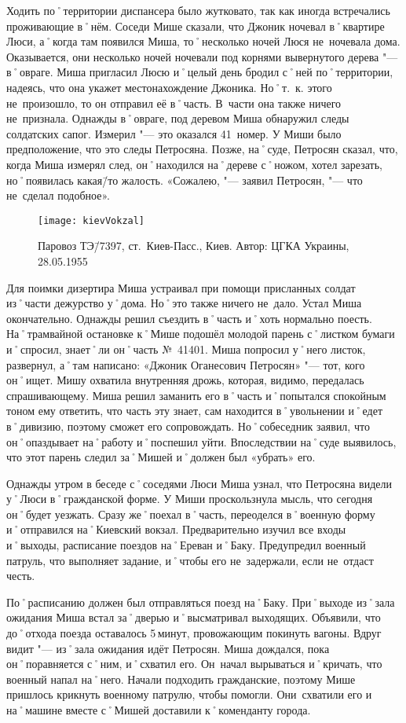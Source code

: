 Ходить по˚территории диспансера было жутковато, так как иногда встречались проживающие в˚нём. Соседи Мише сказали, что Джоник ночевал в˚квартире Люси, а˚когда там появился Миша, то˚несколько ночей Люся не~ночевала дома. Оказывается, они несколько ночей ночевали под корнями вывернутого дерева "--- в˚овраге. Миша пригласил Люсю и˚целый день бродил с˚ней по˚территории, надеясь, что она укажет местонахождение Джоника. Но˚т.~к. этого не~произошло, то он отправил её в˚часть. В~части она также ничего не~признала. Однажды в˚овраге, под деревом Миша обнаружил следы солдатских сапог. Измерил "--- это оказался 41~номер. У Миши  было предположение, что это следы Петросяна. Позже, на˚суде, Петросян сказал, что, когда Миша измерял след, он˚находился на˚дереве с˚ножом, хотел зарезать, но˚появилась какая\=/то жалость. «Сожалею, "--- заявил Петросян, "--- что не~сделал подобное».  

\begin{wrapfigure}{O}{.4\textwidth}
\centering
\texttt{[image: kievVokzal]}
\caption{Паровоз ТЭ\=/7397, ст.~Киев-Пасс., Киев. Автор: ЦГКА Украины, 28.05.1955}
\label{fig:kievVokzal}
\end{wrapfigure}

Для поимки дизертира Миша устраивал при помощи присланных солдат из˚части дежурство у˚дома. Но˚это также ничего не~дало. Устал Миша окончательно. Однажды решил съездить в˚часть и˚хоть нормально поесть. На˚трамвайной остановке к˚Мише подошёл молодой парень с˚листком бумаги и˚спросил, знает˚ли он˚часть №~41401. Миша попросил у˚него листок, развернул, а˚там написано: «Джоник Оганесович Петросян» "--- тот, кого он˚ищет. Мишу охватила внутренняя дрожь, которая, видимо, передалась спрашивающему. Миша решил заманить его в˚часть и˚попытался спокойным тоном ему ответить, что часть эту знает, сам находится в˚увольнении и˚едет в˚дивизию, поэтому сможет его сопровождать.  Но˚собеседник заявил, что он˚опаздывает на˚работу и˚поспешил уйти. Впоследствии на˚суде выявилось, что этот парень следил за˚Мишей и˚должен был «убрать» его.

Однажды утром в беседе с˚соседями Люси Миша узнал, что Петросяна видели у˚Люси в˚гражданской форме. У Миши проскользнула мысль, что сегодня он˚будет уезжать. Сразу же˚поехал в˚часть, переоделся в˚военную форму и˚отправился на˚Киевский вокзал. Предварительно изучил все входы и˚выходы, расписание поездов на˚Ереван и˚Баку. Предупредил военный патруль, что выполняет задание, и˚чтобы его не~задержали, если не~отдаст честь. 

По˚расписанию должен был отправляться поезд на˚Баку. При˚выходе из˚зала ожидания Миша встал за˚дверью и˚высматривал выходящих. Объявили, что до˚отхода поезда оставалось 5\,минут, провожающим покинуть вагоны. Вдруг видит "--- из˚зала ожидания идёт Петросян. Миша дождался, пока он˚поравняется с˚ним, и˚схватил его. Он~начал вырываться и˚кричать, что военный напал на˚него. Начали подходить гражданские, поэтому Мише пришлось крикнуть военному патрулю, чтобы помогли. Они~схватили его и на˚машине вместе с˚Мишей доставили к˚коменданту города. 

